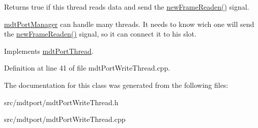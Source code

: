 Returns true if this thread reads data and send the \hyperlink{classmdt_port_thread_a7fc2245c753fd65e1beffec211c41461}{newFrameReaden()} signal. 

\hyperlink{classmdt_port_manager}{mdtPortManager} can handle many threads. It needs to know wich one will send the \hyperlink{classmdt_port_thread_a7fc2245c753fd65e1beffec211c41461}{newFrameReaden()} signal, so it can connect it to his slot. 

Implements \hyperlink{classmdt_port_thread_a3d57f15a864ae45c98eb40dd89f4cec6}{mdtPortThread}.



Definition at line 41 of file mdtPortWriteThread.cpp.



The documentation for this class was generated from the following files:\begin{DoxyCompactItemize}
\item 
src/mdtport/mdtPortWriteThread.h\item 
src/mdtport/mdtPortWriteThread.cpp\end{DoxyCompactItemize}
